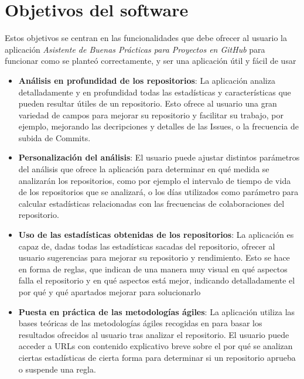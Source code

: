  \label{sec:objetivos}


\section{Objetivos del software}

Estos objetivos se centran en las funcionalidades que debe ofrecer al usuario la aplicación \textit{Asistente de Buenas Prácticas para Proyectos en GitHub} para funcionar como se planteó correctamente, y ser una aplicación útil y fácil de usar

\begin{itemize}
    \item \textbf{Análisis en profundidad de los repositorios}: La aplicación analiza detalladamente y en profundidad todas las estadísticas y características que pueden resultar útiles de un repositorio. Esto ofrece al usuario una gran variedad de campos para mejorar su repositorio y facilitar su trabajo, por ejemplo, mejorando las decripciones y detalles de las Issues, o la frecuencia de subida de Commits.

    \item \textbf{Personalización del análisis}: El usuario puede ajustar distintos parámetros del análisis que ofrece la aplicación para determinar en qué medida se analizarán los repositorios, como por ejemplo el intervalo de tiempo de vida de los repositorios que se analizará, o los días utilizados como parámetro para calcular estadísticas relacionadas con las frecuencias de colaboraciones del repositorio.
    
    \item \textbf{Uso de las estadísticas obtenidas de los repositorios}: La aplicación es capaz de, dadas todas las estadísticas sacadas del repositorio, ofrecer al usuario sugerencias para mejorar su repositorio y rendimiento. Esto se hace en forma de reglas, que indican de una manera muy visual en qué aspectos falla el repositorio y en qué aspectos está mejor, indicando detalladamente el por qué y qué apartados mejorar para solucionarlo
    
    \item \textbf{Puesta en práctica de las metodologías ágiles}: La aplicación utiliza las bases teóricas de las metodologías ágiles recogidas en \cite{agileSubwayMap} para basar los resultados ofrecidos al usuario tras analizar el repositorio. El usuario puede acceder a URLs con contenido explicativo breve sobre el por qué se analizan ciertas estadísticas de cierta forma para determinar si un repositorio aprueba o suspende una regla.
    

\end{itemize}

